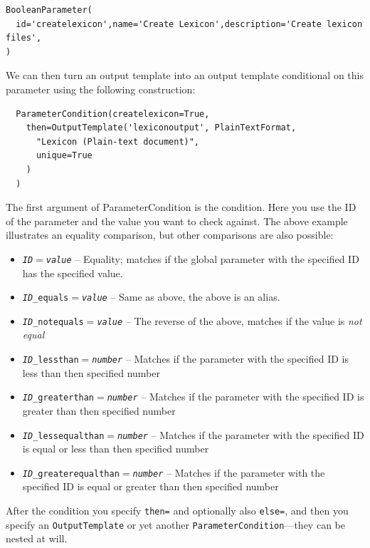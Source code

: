 \documentclass[a4paper,12pt]{report}
\begin{document}
\begin{verbatim}
BooleanParameter(
  id='createlexicon',name='Create Lexicon',description='Create lexicon files', 
)
\end{verbatim}

We can then turn an output template into an output template conditional on this parameter using the following construction:

\begin{verbatim}
  ParameterCondition(createlexicon=True, 
    then=OutputTemplate('lexiconoutput', PlainTextFormat,
      "Lexicon (Plain-text document)",  
      unique=True
    ) 
  )
\end{verbatim}

The first argument of ParameterCondition is the condition. Here you use the ID of the parameter and the value you want to check against. The above example illustrates an equality comparison, but other comparisons are also possible:

\begin{itemize}
\item \texttt{\emph{ID}$=$\emph{value}} -- Equality; matches if the global parameter with the specified ID has the specified value.
\item \texttt{\emph{ID}\_equals$=$\emph{value}} -- Same as above, the above is an alias.
\item \texttt{\emph{ID}\_notequals$=$\emph{value}} -- The reverse of the above, matches if the value is \emph{not equal}
\item \texttt{\emph{ID}\_lessthan$=$\emph{number}} -- Matches if the parameter with the specified ID is less than then specified number
\item \texttt{\emph{ID}\_greaterthan$=$\emph{number}} -- Matches if the parameter with the specified ID is greater than then specified number
\item \texttt{\emph{ID}\_lessequalthan$=$\emph{number}} -- Matches if the parameter with the specified ID is equal or less than then specified number
\item \texttt{\emph{ID}\_greaterequalthan$=$\emph{number}} -- Matches if the parameter with the specified ID is equal or greater than then specified number
\end{itemize}

After the condition you specify \texttt{then=} and optionally also \texttt{else=}, and then you specify an \texttt{OutputTemplate} or yet another \texttt{ParameterCondition}---they can be nested at will.
\end{document}

